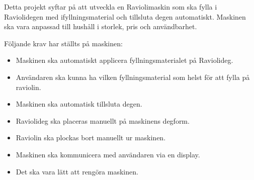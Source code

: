 Detta projekt syftar på att utveckla en Raviolimaskin som ska fylla i Raviolidegen med ifyllningsmaterial och tillsluta degen automatiskt. Maskinen ska vara anpassad till hushåll i storlek, pris och användbarhet.

Följande krav har ställts på maskinen:

\begin{itemize}
	\item Maskinen ska automatiskt applicera fyllningsmaterialet på Raviolideg.
	\item Användaren ska kunna ha vilken fyllningsmaterial som helst för att fylla på raviolin.
	\item Maskinen ska automatisk tillsluta degen.
	\item Raviolideg ska placeras manuellt på maskinens degform.
	\item Raviolin ska plockas bort manuellt ur maskinen.
	\item Maskinen ska kommunicera med användaren via en display.
	\item Det ska vara lätt att rengöra maskinen.	
\end{itemize}